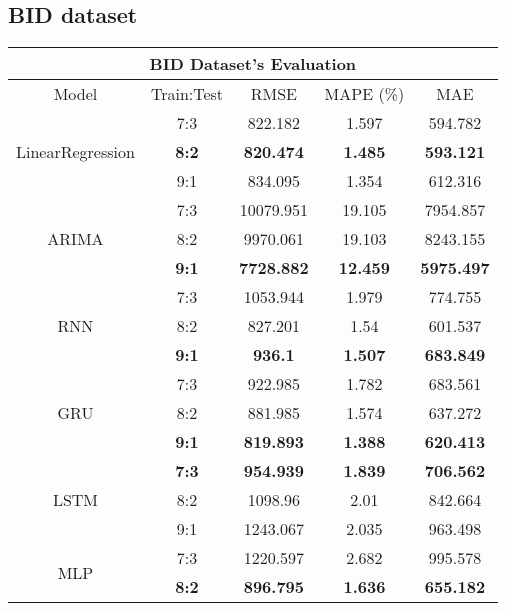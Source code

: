 \documentclass{ieeeojies}
\begin{document}
\subsection{BID dataset} 
\begin{table}[H]
    \centering
    \renewcommand{\arraystretch}{1.1}
    \begin{tabular}{|c|c|c|c|c|}
         \hline
         \multicolumn{5}{|c|}{\textbf{BID Dataset's Evaluation}}\\
         \hline
         \centering Model & Train:Test & RMSE & MAPE (\%) & MAE\\
         \hline
         \multirow{3}{*}{LinearRegression} 
         & 7:3 & 822.182 & 1.597 & 594.782 \\ 
         & \textbf{8:2} & \textbf{820.474} & \textbf{1.485} & \textbf{593.121} \\ 
         & 9:1 & 834.095 & 1.354 & 612.316\\
         \hline
         \multirow{3}{*}{ARIMA} 
         & 7:3 & 10079.951 & 19.105 & 7954.857\\ 
         & 8:2 & 9970.061 & 19.103 & 8243.155 \\ 
         & \textbf{9:1} & \textbf{7728.882} & \textbf{12.459} & \textbf{5975.497}\\
         \hline
         \multirow{3}{*}{RNN} 
         & 7:3 & 1053.944 & 1.979 & 774.755 \\ 
         & 8:2 & 827.201 & 1.54 & 601.537 \\ 
         & \textbf{9:1} & \textbf{936.1}  & \textbf{1.507} & \textbf{683.849}\\
         \hline
         \multirow{3}{*}{GRU} 
         & 7:3 &  922.985 &  1.782 & 683.561 \\ 
         & 8:2 &  881.985 & 1.574 & 637.272 \\ 
         & \textbf{9:1} & \textbf{819.893}  & \textbf{1.388} & \textbf{620.413}\\
         \hline
         \multirow{3}{*}{LSTM} 
         & \textbf{7:3} & \textbf{954.939} & \textbf{1.839} & \textbf{706.562} \\ 
         & 8:2 & 1098.96 & 2.01 & 842.664 \\ 
         & 9:1 & 1243.067  & 2.035 & 963.498\\
         \hline
         \multirow{3}{*}{MLP} 
         & 7:3 & 1220.597 & 2.682 & 995.578 \\ 
         & \textbf{8:2} & \textbf{896.795} & \textbf{1.636} & \textbf{655.182} \\ 

\end{tabular}
\end{table}
\end{document}
